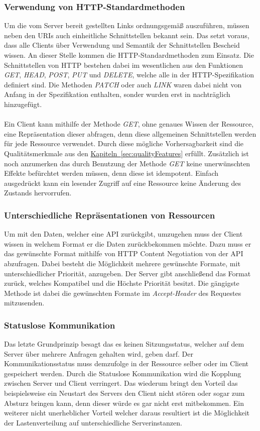 \subsubsection{Verwendung von HTTP-Standardmethoden}
Um die vom Server bereit gestellten Links ordnungsgemäß auszuführen, müssen neben den \glspl{URI} auch einheitliche Schnittstellen bekannt sein. Das setzt voraus, dass alle Clients über Verwendung und Semantik der Schnittstellen Bescheid wissen. An dieser Stelle kommen die \gls{HTTP}-Standardmethoden zum Einsatz. Die Schnittstellen von \gls{HTTP} bestehen dabei im wesentlichen aus den Funktionen \textit{GET}, \textit{HEAD}, \textit{POST}, \textit{PUT} und \textit{DELETE}, welche alle in der \gls{HTTP}-Spezifikation \cite{httpSpecification} definiert sind. Die Methoden \textit{PATCH} oder auch \textit{LINK} waren dabei nicht von Anfang in der Spezifikation enthalten, sonder wurden erst in nachträglich hinzugefügt.\\
\\
Ein Client kann mithilfe der Methode \textit{GET}, ohne genaues Wissen der Ressource, eine Repräsentation dieser abfragen, denn diese allgemeinen Schnittstellen werden für jede Ressource verwendet. Durch diese mögliche Vorhersagbarkeit sind die Qualitätsmerkmale aus den \hyperref[sec:qualityFeatures]{Kapiteln~\ref{sec:qualityFeatures}} erfüllt. Zusätzlich ist noch anzumerken das durch Benutzung der Methode \textit{GET} keine unerwünschten Effekte befürchtet werden müssen, denn diese ist idempotent. Einfach ausgedrückt kann ein lesender Zugriff auf eine Ressource keine Änderung des Zustands hervorrufen.

\subsubsection{Unterschiedliche Repräsentationen von Ressourcen}
Um mit den Daten, welcher eine \gls{API} zurückgibt, umzugehen muss der Client wissen in welchem Format er die Daten zurückbekommen möchte. Dazu muss er das gewünschte Format mithilfe von \gls{HTTP} Content Negotiation von der \gls{API} abzufragen. Dabei besteht die Möglichkeit mehrere gewünschte Formate, mit unterschiedlicher Priorität, anzugeben. Der Server gibt anschließend das Format zurück, welches Kompatibel und die Höchste Priorität besitzt. Die gängigste Methode ist dabei die gewünschten Formate im \textit{Accept-Header} des Requestes mitzusenden.

\subsubsection{Statuslose Kommunikation}
Das letzte Grundprinzip besagt das es keinen Sitzungsstatus, welcher auf dem Server über mehrere Anfragen gehalten wird, geben darf. Der Kommunikationsstatus muss demzufolge in der Ressource selber oder im Client gespeichert werden. Durch die Statuslose Kommunikation wird die Kopplung zwischen Server und Client verringert. Das wiederum bringt den Vorteil das beispielsweise ein Neustart des Servers den Client nicht stören oder sogar zum Absturz bringen kann, denn dieser würde es gar nicht erst mitbekommen. Ein weiterer nicht unerheblicher Vorteil welcher daraus resultiert ist die Möglichkeit der Lastenverteilung auf unterschiedliche Serverinstanzen.

